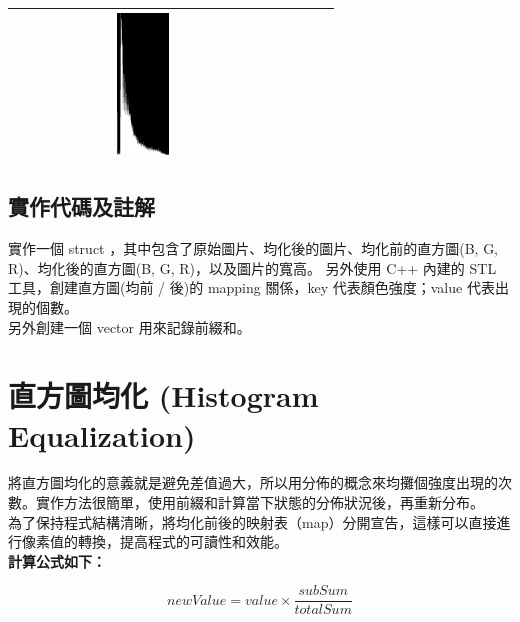 \documentclass[12pt,a4paper]{article}
\begin{document}
\begin{center}
\begin{longtable}{|c|c|c|c|c|}
       \includegraphics[width=0.2\textwidth]{./latexSource/Canada_R_HIS.png} \\ 
\hline
\end{longtable}
\end{center}



\subsection{實作代碼及註解}
實作一個 struct ，其中包含了原始圖片、均化後的圖片、均化前的直方圖(B, G, R)、均化後的直方圖(B, G, R)，以及圖片的寬高。
另外使用 C++ 內建的 STL 工具，創建直方圖(均前 / 後)的 mapping 關係，key 代表顏色強度；value 代表出現的個數。\\
另外創建一個 vector 用來記錄前綴和。




\section{直方圖均化 (Histogram Equalization)}
將直方圖均化的意義就是避免差值過大，所以用分佈的概念來均攤個強度出現的次數。實作方法很簡單，使用前綴和計算當下狀態的分佈狀況後，再重新分布。 \\
為了保持程式結構清晰，將均化前後的映射表（map）分開宣告，這樣可以直接進行像素值的轉換，提高程式的可讀性和效能。 \\

\textbf{計算公式如下：}

\[
newValue = value  \times \frac{subSum}{totalSum}
\]
\end{document}

